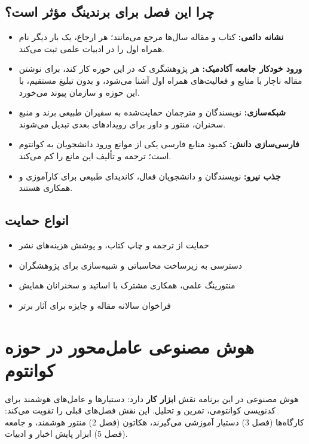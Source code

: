 \documentclass[a4paper,12pt]{article}
\begin{document}
	\subsection{چرا این فصل برای برندینگ مؤثر است؟}
	\begin{itemize}[rightmargin=0.5cm, itemsep=4pt]
		\item \textbf{نشانه دائمی:} کتاب و مقاله سال‌ها مرجع می‌مانند؛ هر ارجاع، یک بار دیگر نام همراه اول را در ادبیات علمی ثبت می‌کند.
		\item \textbf{ورود خودکار جامعه آکادمیک:} هر پژوهشگری که در این حوزه کار کند، برای نوشتن مقاله ناچار با منابع و فعالیت‌های همراه اول آشنا می‌شود، و بدون تبلیغ مستقیم، با این حوزه و سازمان پیوند می‌خورد.
		\item \textbf{شبکه‌سازی:} نویسندگان و مترجمان حمایت‌شده به سفیران طبیعی برند و منبع سخنران، منتور و داور برای رویدادهای بعدی تبدیل می‌شوند.
		\item \textbf{فارسی‌سازی دانش:} کمبود منابع فارسی یکی از موانع ورود دانشجویان به کوانتوم است؛ ترجمه و تألیف این مانع را کم می‌کند.
		\item \textbf{جذب نیرو:} نویسندگان و دانشجویان فعال، کاندیدای طبیعی برای کارآموزی و همکاری هستند.
	\end{itemize}

	\subsection{انواع حمایت}
	\begin{itemize}[rightmargin=0.5cm, itemsep=3pt]
		\item حمایت از ترجمه و چاپ کتاب، و پوشش هزینه‌های نشر
		\item دسترسی به زیرساخت محاسباتی و شبیه‌سازی برای پژوهشگران
		\item منتورینگ علمی، همکاری مشترک با اساتید و سخنرانان همایش
		\item فراخوان سالانه مقاله و جایزه برای آثار برتر
	\end{itemize}

	\newpage
	\section{هوش مصنوعی عامل‌محور در حوزه کوانتوم}

	هوش مصنوعی در این برنامه نقش \textbf{ابزار کار} دارد: دستیارها و عامل‌های هوشمند برای کدنویسی کوانتومی، تمرین و تحلیل.
	این نقش فصل‌های قبلی را تقویت می‌کند: کارگاه‌ها (فصل 3) دستیار آموزشی می‌گیرند، هکاتون (فصل 2) منتور هوشمند،
	و جامعه (فصل 5) ابزار پایش اخبار و ادبیات.
\end{document}
